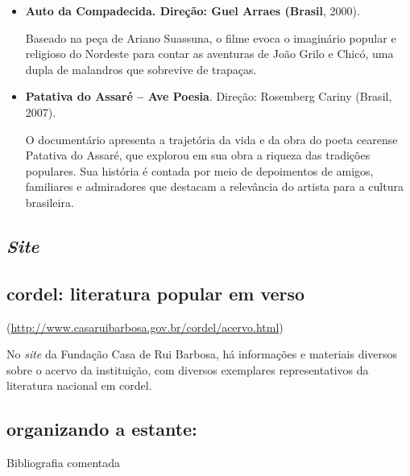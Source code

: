 \documentclass[12pt]{extarticle}
\begin{document}
\begin{itemize}
\item \textbf{Auto da Compadecida. Direção: Guel Arraes (Brasil}, 2000).

Baseado na peça de Ariano Suassuna, o filme evoca o imaginário popular e
religioso do Nordeste para contar as aventuras de João Grilo e Chicó,
uma dupla de malandros que sobrevive de trapaças.


\item \textbf{Patativa do Assaré -- Ave Poesia}. Direção: Rosemberg Cariny
(Brasil, 2007).

O documentário apresenta a trajetória da vida e da obra do poeta
cearense Patativa do Assaré, que explorou em sua obra a riqueza das
tradições populares. Sua história é contada por meio de depoimentos de
amigos, familiares e admiradores que destacam a relevância do artista
para a cultura brasileira.
\end{itemize}


  \subsection{\emph{Site}}


\subsection{cordel: literatura popular em verso }

(\url{http://www.casaruibarbosa.gov.br/cordel/acervo.html})

No \emph{site} da Fundação Casa de Rui Barbosa, há informações e
materiais diversos sobre o acervo da instituição, com diversos
exemplares representativos da literatura nacional em cordel.

\subsection{organizando a estante:} Bibliografia comentada
\end{document}

